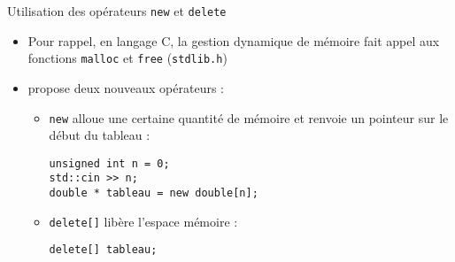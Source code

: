 \documentclass[c]{beamer}
\begin{document}
\begin{frame}[fragile]{Utilisation des opérateurs \texttt{new} et \texttt{delete}}
 \begin{itemize}
\item Pour rappel, en langage C, la gestion dynamique de mémoire fait appel aux
fonctions \texttt{malloc} et \texttt{free} (\texttt{stdlib.h})

\item \Cpp propose deux nouveaux opérateurs :

\begin{itemize}
\item \texttt{new} alloue une certaine quantité de mémoire et renvoie un pointeur sur le
début du tableau :
\begin{verbatim}
unsigned int n = 0;
std::cin >> n;
double * tableau = new double[n];
\end{verbatim}

\item \texttt{delete[]} libère l'espace mémoire :
\begin{verbatim}
delete[] tableau;
\end{verbatim}
\end{itemize}
\end{itemize}
\end{frame}


\end{document}
